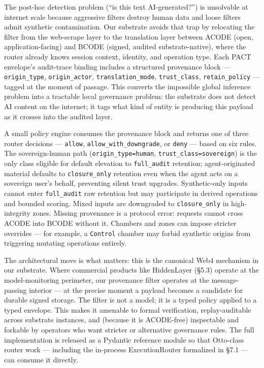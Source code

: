 \documentclass{article}
\begin{document}
The post-hoc detection problem (``is this text AI-generated?'') is
unsolvable at internet scale because aggressive filters destroy human
data and loose filters admit synthetic contamination. Our substrate
avoids that trap by relocating the filter from the web-scrape layer to
the translation layer between ACODE (open, application-facing) and BCODE
(signed, audited substrate-native), where the router already knows
session context, identity, and operation type. Each PACT envelope's
audit-trace binding includes a structured provenance block ---
\texttt{origin\_type}, \texttt{origin\_actor},
\texttt{translation\_mode}, \texttt{trust\_class},
\texttt{retain\_policy} --- tagged at the moment of passage. This
converts the impossible global inference problem into a tractable local
governance problem: the substrate does not detect AI content on the
internet; it tags what kind of entity is producing this payload as it
crosses into the audited layer.

A small policy engine consumes the provenance block and returns one of
three router decisions --- \texttt{allow},
\texttt{allow\_with\_downgrade}, or \texttt{deny} --- based on six
rules. The sovereign-human path (\texttt{origin\_type=human},
\texttt{trust\_class=sovereign}) is the only class eligible for default
elevation to \texttt{full\_audit} retention; agent-originated material
defaults to \texttt{closure\_only} retention even when the agent acts on
a sovereign user's behalf, preventing silent trust upgrades.
Synthetic-only inputs cannot enter \texttt{full\_audit} raw retention
but may participate in derived operations and bounded scoring. Mixed
inputs are downgraded to \texttt{closure\_only} in high-integrity zones.
Missing provenance is a protocol error: requests cannot cross ACODE into
BCODE without it. Chambers and zones can impose stricter overrides ---
for example, a \texttt{Control} chamber may forbid synthetic origins
from triggering mutating operations entirely.

The architectural move is what matters: this is the canonical Web4
mechanism in our substrate. Where commercial products like HiddenLayer
(§5.3) operate at the model-monitoring perimeter, our provenance filter
operates at the message-passing interior --- at the precise moment a
payload becomes a candidate for durable signed storage. The filter is
not a model; it is a typed policy applied to a typed envelope. This
makes it amenable to formal verification, replay-auditable across
substrate instances, and (because it is ACODE-free) inspectable and
forkable by operators who want stricter or alternative governance rules.
The full implementation is released as a Pydantic reference module so
that Otto-class router work --- including the in-process ExecutionRouter
formalized in §7.1 --- can consume it directly.
\end{document}
